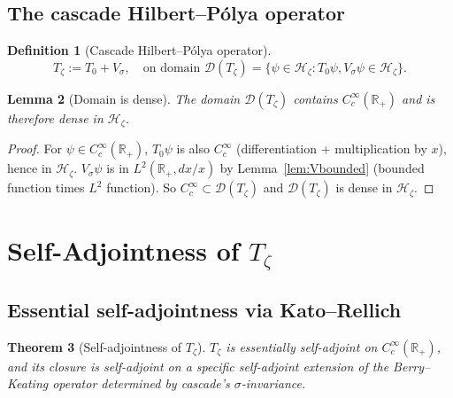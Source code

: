 \documentclass[11pt, a4paper]{amsart}
\newtheorem{theorem}{Theorem}[section]
\newtheorem{lemma}[theorem]{Lemma}
\theoremstyle{definition}
\newtheorem{definition}[theorem]{Definition}
\newcommand{\R}{\mathbb{R}}
\newcommand{\HH}{\mathcal{H}}
\newcommand{\D}{\mathcal{D}}
\begin{document}
\subsection{The cascade Hilbert--P\'olya operator}

\begin{definition}[Cascade Hilbert--P\'olya operator]\label{def:Tzeta}
\[
T_\zeta := T_0 + V_\sigma, \quad \text{on domain } \D(T_\zeta) =
\{\psi \in \HH_\zeta : T_0 \psi, V_\sigma \psi \in \HH_\zeta\}.
\]
\end{definition}

\begin{lemma}[Domain is dense]\label{lem:dense}
The domain $\D(T_\zeta)$ contains $C_c^\infty(\R_+)$ and is therefore
dense in $\HH_\zeta$.
\end{lemma}

\begin{proof}
For $\psi \in C_c^\infty(\R_+)$, $T_0 \psi$ is also $C_c^\infty$
(differentiation + multiplication by $x$), hence in $\HH_\zeta$.
$V_\sigma \psi$ is in $L^2(\R_+, dx/x)$ by Lemma~\ref{lem:Vbounded}
(bounded function times $L^2$ function). So $C_c^\infty \subset \D(T_\zeta)$
and $\D(T_\zeta)$ is dense in $\HH_\zeta$.
\end{proof}

\section{Self-Adjointness of $T_\zeta$}

\subsection{Essential self-adjointness via Kato--Rellich}

\begin{theorem}[Self-adjointness of $T_\zeta$]\label{thm:selfadj}
$T_\zeta$ is essentially self-adjoint on $C_c^\infty(\R_+)$, and its
closure is self-adjoint on a specific self-adjoint extension of the
Berry--Keating operator determined by cascade's $\sigma$-invariance.
\end{theorem}
\end{document}
